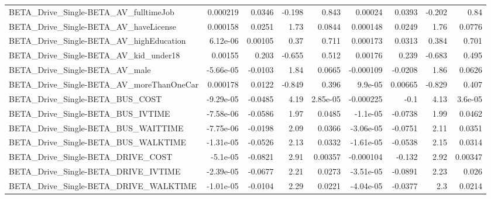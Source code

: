 \begin{tabular}{lrrrrrrrr}
BETA\_Drive\_Single-BETA\_AV\_fulltimeJob              &    0.000219 &       0.0346 &    -0.198 &    0.843 &    0.00024 &      0.0393 &       -0.202 &          0.84 \\
BETA\_Drive\_Single-BETA\_AV\_haveLicense              &    0.000158 &       0.0251 &      1.73 &   0.0844 &   0.000148 &      0.0249 &         1.76 &        0.0776 \\
BETA\_Drive\_Single-BETA\_AV\_highEducation            &    6.12e-06 &      0.00105 &      0.37 &    0.711 &   0.000173 &      0.0313 &        0.384 &         0.701 \\
BETA\_Drive\_Single-BETA\_AV\_kid\_under18              &     0.00155 &        0.203 &    -0.655 &    0.512 &    0.00176 &       0.239 &       -0.683 &         0.495 \\
BETA\_Drive\_Single-BETA\_AV\_male                     &   -5.66e-05 &      -0.0103 &      1.84 &   0.0665 &  -0.000109 &     -0.0208 &         1.86 &        0.0626 \\
BETA\_Drive\_Single-BETA\_AV\_moreThanOneCar           &    0.000178 &       0.0122 &    -0.849 &    0.396 &    9.9e-05 &     0.00665 &       -0.829 &         0.407 \\
BETA\_Drive\_Single-BETA\_BUS\_COST                    &   -9.29e-05 &      -0.0485 &      4.19 & 2.85e-05 &  -0.000225 &        -0.1 &         4.13 &       3.6e-05 \\
BETA\_Drive\_Single-BETA\_BUS\_IVTIME                  &   -7.58e-06 &      -0.0586 &      1.97 &   0.0485 &   -1.1e-05 &     -0.0738 &         1.99 &        0.0462 \\
BETA\_Drive\_Single-BETA\_BUS\_WAITTIME                &   -7.75e-06 &      -0.0198 &      2.09 &   0.0366 &  -3.06e-05 &     -0.0751 &         2.11 &        0.0351 \\
BETA\_Drive\_Single-BETA\_BUS\_WALKTIME                &   -1.31e-05 &      -0.0526 &      2.13 &   0.0332 &  -1.61e-05 &     -0.0538 &         2.15 &        0.0314 \\
BETA\_Drive\_Single-BETA\_DRIVE\_COST                  &    -5.1e-05 &      -0.0821 &      2.91 &  0.00357 &  -0.000104 &      -0.132 &         2.92 &       0.00347 \\
BETA\_Drive\_Single-BETA\_DRIVE\_IVTIME                &   -2.39e-05 &      -0.0677 &      2.21 &   0.0273 &  -3.51e-05 &     -0.0891 &         2.23 &         0.026 \\
BETA\_Drive\_Single-BETA\_DRIVE\_WALKTIME              &   -1.01e-05 &      -0.0104 &      2.29 &   0.0221 &  -4.04e-05 &     -0.0377 &          2.3 &        0.0214 \\

\end{tabular}

